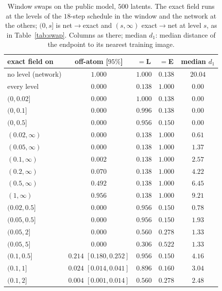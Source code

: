 \documentclass{article} %
\theoremstyle{plain}
\theoremstyle{definition}
\theoremstyle{remark}
\begin{document}
\begin{table}[h]
\centering\small
\begin{tabular}{@{}lcccc@{}}
\toprule
exact field on & off-atom [$95\%$] & $=$L & $=$E & median $d_1$\\
\midrule
no level (network) & $1.000$ & $1.000$ & $0.138$ & $20.04$\\
every level & $0.000$ & $0.138$ & $1.000$ & $0.00$\\
\midrule
$(0,0.02]$ & $0.000$ & $1.000$ & $0.138$ & $0.00$\\
$(0,0.1]$ & $0.000$ & $0.996$ & $0.138$ & $0.00$\\
$(0,0.5]$ & $0.000$ & $0.956$ & $0.150$ & $0.00$\\
\midrule
$(0.02,\infty)$ & $0.000$ & $0.138$ & $1.000$ & $0.61$\\
$(0.05,\infty)$ & $0.000$ & $0.138$ & $1.000$ & $1.37$\\
$(0.1,\infty)$ & $0.002$ & $0.138$ & $1.000$ & $2.57$\\
$(0.2,\infty)$ & $0.070$ & $0.138$ & $1.000$ & $4.22$\\
$(0.5,\infty)$ & $0.492$ & $0.138$ & $1.000$ & $6.45$\\
$(1,\infty)$ & $0.956$ & $0.138$ & $1.000$ & $9.21$\\
\midrule
$(0.02,0.5]$ & $0.000$ & $0.956$ & $0.150$ & $0.78$\\
$(0.05,0.5]$ & $0.000$ & $0.956$ & $0.150$ & $1.93$\\
$(0.05,2]$ & $0.000$ & $0.560$ & $0.278$ & $1.33$\\
$(0.05,5]$ & $0.000$ & $0.306$ & $0.522$ & $1.33$\\
$(0.1,0.5]$ & $0.214$ $[0.180,0.252]$ & $0.956$ & $0.150$ & $4.16$\\
$(0.1,1]$ & $0.024$ $[0.014,0.041]$ & $0.896$ & $0.160$ & $3.04$\\
$(0.1,2]$ & $0.004$ $[0.001,0.014]$ & $0.560$ & $0.278$ & $2.48$\\
\bottomrule
\end{tabular}
\caption{Window swaps on the public model, $500$ latents. The exact field runs at the levels of
the $18$-step schedule in the window and the network at the others; $(0,s]$ is net$\to$exact and
$(s,\infty)$ exact$\to$net at level $s$, as in Table~\ref{tab:swap}. Columns as there; median
$d_1$: median distance of the endpoint to its nearest training image.}
\label{tab:window}
\end{table}
\end{document}
